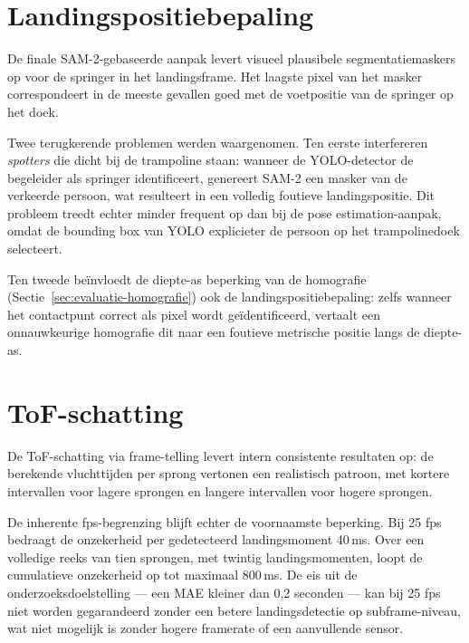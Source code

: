 
\section{Landingspositiebepaling}
\label{sec:evaluatie-landingspositie}

De finale SAM-2-gebaseerde aanpak levert visueel plausibele segmentatiemaskers op voor de springer in het landingsframe. Het laagste pixel van het masker correspondeert in de meeste gevallen goed met de voetpositie van de springer op het doek.

Twee terugkerende problemen werden waargenomen. Ten eerste interfereren \textit{spotters} die dicht bij de trampoline staan: wanneer de YOLO-detector de begeleider als springer identificeert, genereert SAM-2 een masker van de verkeerde persoon, wat resulteert in een volledig foutieve landingspositie. Dit probleem treedt echter minder frequent op dan bij de pose estimation-aanpak, omdat de bounding box van YOLO explicieter de persoon op het trampolinedoek selecteert.

Ten tweede beïnvloedt de diepte-as beperking van de homografie (Sectie~\ref{sec:evaluatie-homografie}) ook de landingspositiebepaling: zelfs wanneer het contactpunt correct als pixel wordt geïdentificeerd, vertaalt een onnauwkeurige homografie dit naar een foutieve metrische positie langs de diepte-as.


\section{ToF-schatting}
\label{sec:evaluatie-tof}

De ToF-schatting via frame-telling levert intern consistente resultaten op: de berekende vluchttijden per sprong vertonen een realistisch patroon, met kortere intervallen voor lagere sprongen en langere intervallen voor hogere sprongen.

De inherente fps-begrenzing blijft echter de voornaamste beperking. Bij 25 fps bedraagt de onzekerheid per gedetecteerd landingsmoment 40\,ms. Over een volledige reeks van tien sprongen, met twintig landingsmomenten, loopt de cumulatieve onzekerheid op tot maximaal 800\,ms. De eis uit de onderzoeksdoelstelling --- een MAE kleiner dan 0,2 seconden --- kan bij 25 fps niet worden gegarandeerd zonder een betere landingsdetectie op subframe-niveau, wat niet mogelijk is zonder hogere framerate of een aanvullende sensor.

